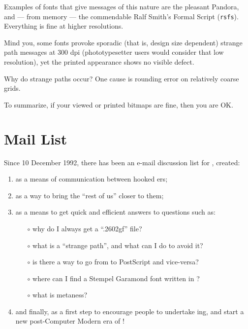 Examples of fonts that give messages of this nature are the pleasant
Pandora, and --- from memory --- the commendable Ralf Smith's
Formal Script ({\tt rsfs}).  Everything is fine at higher resolutions.

Mind you, some fonts provoke sporadic
(that is, design size dependent)
strange path messages at 300 dpi
(phototypesetter users would consider that low resolution),
yet the printed appearance shows no visible defect.

Why do strange paths occur?
One cause is rounding error on relatively coarse grids.

To summarize, if your viewed or printed bitmaps are fine,
then you are OK.


\section{\MF{} Mail List}

Since 10 December 1992, there has been an e-mail discussion list
for \MF{}, created:

\begin{enumerate}
\item  as a means of communication between hooked \MF{}ers;

\item  as a way to bring the ``rest of us'' closer to them;

\item  as a means to get quick and efficient answers to questions
       such as:

\begin{itemize}
    \item[$\circ$]  why do I always get a ``.2602gf'' file?
    \item[$\circ$]  what is a ``strange path'',
                  and what can I do to avoid it?
    \item[$\circ$]  is there a way to go from \MF{} to PostScript
                  and vice-versa?
    \item[$\circ$]  where can I find a Stempel Garamond font
                  written in \MF{}?
    \item[$\circ$]  what is metaness?
\end{itemize}

\item  and finally, as a first step to encourage people to undertake
    \MF{}ing, and start a new post-Computer Modern era of \MF{}!
\end{enumerate}


